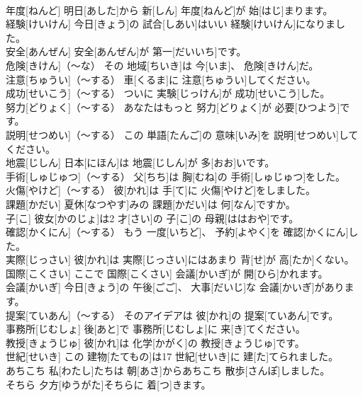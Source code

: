 \documentclass[8pt]{extreport}
\begin{document}
\begin{CJK}{UTF8}{min}
\\	年度[ねんど]	明日[あした]から 新[しん] 年度[ねんど]が 始[はじ]まります。		
\\	経験[けいけん]	今日[きょう]の 試合[しあい]はいい 経験[けいけん]になりました。		
\\	安全[あんぜん]	安全[あんぜん]が 第一[だいいち]です。		
\\	危険[きけん]（～な）	その 地域[ちいき]は 今[いま]、 危険[きけん]だ。		
\\	注意[ちゅうい]（～する）	車[くるま]に 注意[ちゅうい]してください。		
\\	成功[せいこう]（～する）	ついに 実験[じっけん]が 成功[せいこう]した。		
\\	努力[どりょく]（～する）	あなたはもっと 努力[どりょく]が 必要[ひつよう]です。		
\\	説明[せつめい]（～する）	この 単語[たんご]の 意味[いみ]を 説明[せつめい]してください。		
\\	地震[じしん]	日本[にほん]は 地震[じしん]が 多[おお]いです。		
\\	手術[しゅじゅつ]（～する）	父[ちち]は 胸[むね]の 手術[しゅじゅつ]をした。		
\\	火傷[やけど]（～する）	彼[かれ]は 手[て]に 火傷[やけど]をしました。		
\\	課題[かだい]	夏休[なつやす]みの 課題[かだい]は 何[なん]ですか。		
\\	子[こ]	彼女[かのじょ]は2 才[さい]の 子[こ]の 母親[ははおや]です。		
\\	確認[かくにん]（～する）	もう 一度[いちど]、 予約[よやく]を 確認[かくにん]した。		
\\	実際[じっさい]	彼[かれ]は 実際[じっさい]にはあまり 背[せ]が 高[たか]くない。		
\\	国際[こくさい]	ここで 国際[こくさい] 会議[かいぎ]が 開[ひら]かれます。		
\\	会議[かいぎ]	今日[きょう]の 午後[ごご]、 大事[だいじ]な 会議[かいぎ]があります。		
\\	提案[ていあん]（～する）	そのアイデアは 彼[かれ]の 提案[ていあん]です。		
\\	事務所[じむしょ]	後[あと]で 事務所[じむしょ]に 来[き]てください。		
\\	教授[きょうじゅ]	彼[かれ]は 化学[かがく]の 教授[きょうじゅ]です。		
\\	世紀[せいき]	この 建物[たてもの]は17 世紀[せいき]に 建[た]てられました。		
\\	あちこち	私[わたし]たちは 朝[あさ]からあちこち 散歩[さんぽ]しました。		
\\	そちら	夕方[ゆうがた]そちらに 着[つ]きます。		

\end{CJK}
\end{document}
